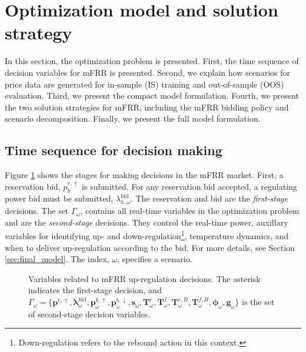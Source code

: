 \section{Optimization model and solution strategy}\label{sec:OptimizationModel}

In this section, the optimization problem is presented. First, the time sequence of decision variables for mFRR is presented. Second, we explain how scenarios for price data are generated for in-sample (IS) training and out-of-sample (OOS) evaluation. Third, we present the compact model formulation. Fourth, we present the two solution strategies for mFRR, including the mFRR bidding policy and scenario decomposition. Finally, we present the full model formulation.

\subsection{Time sequence for decision making}

Figure \ref{fig:timeline_mfrr_variables} shows the stages for making decisions in the mFRR market. First, a reservation bid, $p_{h}^{r,\uparrow}$ is submitted. For any reservation bid accepted, a regulating power bid must be submitted, $\lambda_{h,\omega}^{\text{bid}}$. The reservation and bid are the \textit{first-stage} decisions. The set $\Gamma_{\omega}$, contains all real-time variables in the optimization problem and are the \textit{second-stage} decisions. They control the real-time power, auxillary variables for identifying up- and down-regulation\footnote{Down-regulation refers to the rebound action in this context.}, temperature dynamics, and when to deliver up-regulation according to the bid. For more details, see Section \ref{sec:final_model}. The index, $\omega$, specifies a scenario.



\begin{figure}[!t]
    \centering
    
    \caption{Variables related to mFRR up-regulation decisions. The asterisk indicates the first-stage decision, and \\ $\Gamma_{\omega} = \{ \bm{p}^{r,\uparrow}, \bm{\lambda}_{\omega}^{\text{bid}}, \bm{p}_{\omega}^{b,\uparrow}, \bm{p}_{\omega}^{b,\downarrow}, \bm{s}_{\omega}, \bm{T}_{\omega}^{c}, \bm{T}_{\omega}^{f}, \bm{T}_{\omega}^{c, B}, \bm{T}_{\omega}^{f,B}, \bm{\phi}_{\omega}, \bm{g}_{\omega} \}$ is the set of second-stage decision variables.}
    \label{fig:timeline_mfrr_variables}
\end{figure}

